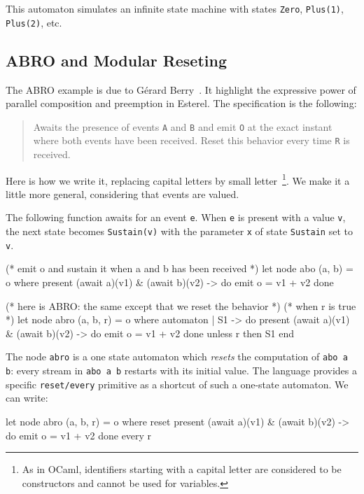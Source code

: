 \documentclass[11pt,titlepage,twoside]{report}
\newcommand{\ocaml}{{\sf OCaml}}
\begin{document}
This automaton simulates an infinite state machine with states
\verb-Zero-, \verb-Plus(1)-, \verb-Plus(2)-, etc.

\subsection{ABRO and Modular Reseting}
The ABRO example is due to G\'erard Berry~\cite{esterel:primer99}. It
highlight the expressive power of parallel composition and preemption
in Esterel. The specification is the following:

\begin{quote}
Awaits the presence of events \verb-A- and \verb-B- and emit \verb-O-
at the exact instant where both events have been received.  Reset this
behavior every time \verb-R- is received.
\end{quote}
Here is how we write it, replacing capital letters by small
letter~\footnote{As in \ocaml, identifiers starting with a capital
  letter are considered to be constructors and cannot be used for
  variables.}. We make it a little more general, considering that
events are valued.

The following function awaits for an event \texttt{e}. When \texttt{e} is present with
a value \texttt{v}, the next state becomes \texttt{Sustain(v)} with the parameter
\texttt{x} of state \texttt{Sustain} set to \texttt{v}.
\begin{runverbatim}[withresult,include=await,label=abo]
(* emit o and sustain it when a and b has been received *)
let node abo (a, b) = o where
  present (await a)(v1) & (await b)(v2) -> do emit o = v1 + v2 done
\end{runverbatim}

\begin{runverbatim}
(* here is ABRO: the same except that we reset the behavior *)
(* when r is true *)
let node abro (a, b, r) = o where
  automaton
  | S1 ->
       do present (await a)(v1) & (await b)(v2) -> do emit o = v1 + v2 done
       unless r then S1
  end
\end{runverbatim}

The node \verb-abro- is a one state automaton which {\em resets} the
computation of \verb-abo a b-: every stream in \verb-abo a b- restarts
with its initial value. The language provides a specific
\verb-reset/every- primitive as a shortcut of such a one-state
automaton. We can write:

\begin{runverbatim}[withresult,include=await]
let node abro (a, b, r) = o where
  reset
    present (await a)(v1) & (await b)(v2) -> do emit o = v1 + v2 done
  every r
\end{runverbatim}
\end{document}
